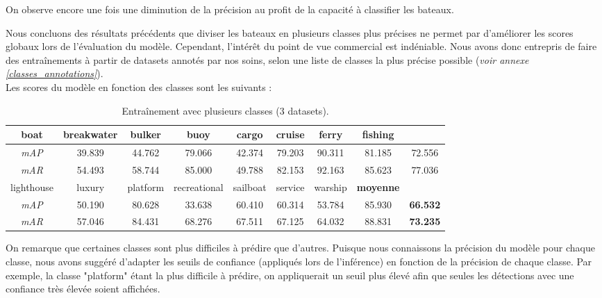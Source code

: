On observe encore une fois une diminution de la précision au profit de la capacité à classifier
les bateaux.

Nous concluons des résultats précédents que diviser les bateaux en plusieurs classes plus précises
ne permet par d'améliorer les scores globaux lors de l'évaluation du modèle. Cependant,
l'intérêt du point de vue commercial est indéniable. Nous avons donc entrepris de faire des
entraînements à partir de datasets annotés par nos soins, selon une liste de classes
la plus précise possible (\textit{voir annexe \ref{classes_annotations}}).\\

Les scores du modèle en fonction des classes sont les suivants : \\

\begin{table}[H]
    \begin{center}
        \begin{tabular}{c c c c c c c c c}
            \hline
            boat & breakwater & bulker & buoy & cargo & cruise & ferry & fishing \\
            \hline
            
            \textit{mAP} & 39.839 & 44.762 & 79.066 & 42.374 & 79.203 & 90.311 & 81.185 & 72.556 \\
            \textit{mAR} & 54.493 & 58.744 & 85.000 & 49.788 & 82.153 & 92.163 & 85.623 & 77.036 \\
            \hline
            lighthouse & luxury & platform & recreational & sailboat & service & warship & \textbf{moyenne} \\
            \hline
            
            \textit{mAP} & 50.190 & 80.628 & 33.638 & 60.410 & 60.314 & 53.784 & 85.930 & \textbf{66.532 }\\
            \textit{mAR} & 57.046 & 84.431 & 68.276 & 67.511 & 67.125 & 64.032 & 88.831 & \textbf{73.235 }\\
        \end{tabular}
    \end{center}
    \caption{Entraînement avec plusieurs classes (3 datasets).}
\end{table}

On remarque que certaines classes sont plus difficiles à prédire que d'autres.
Puisque nous connaissons la précision du modèle pour chaque classe, nous avons suggéré d'adapter les
seuils de confiance (appliqués lors de l'inférence) en fonction de la précision de chaque classe.
Par exemple, la classe "platform" étant la plus difficile à prédire, on appliquerait un seuil plus élevé afin
que seules les détections avec une confiance très élevée soient affichées.

